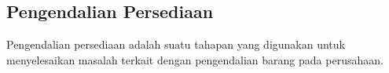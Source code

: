 \begin{spacing}{1.5}










\section{Pengendalian Persediaan}

Pengendalian persediaan adalah suatu tahapan yang digunakan untuk menyelesaikan masalah terkait dengan pengendalian barang pada perusahaan.


\end{spacing}
